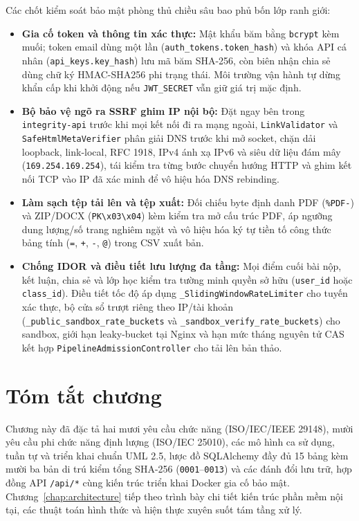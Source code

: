 Các chốt kiểm soát bảo mật phòng thủ chiều sâu bao phủ bốn lớp ranh giới:
{\setlength{\itemsep}{0pt}\setlength{\parskip}{0pt}
\begin{itemize}
    \item \textbf{Gia cố token và thông tin xác thực:} Mật khẩu băm bằng \texttt{bcrypt} kèm muối; token email dùng một lần (\texttt{auth\_tokens.token\_hash}) và khóa API cá nhân (\texttt{api\_keys.key\_hash}) lưu mã băm SHA-256, còn biên nhận chia sẻ dùng chữ ký HMAC-SHA256 phi trạng thái. Môi trường vận hành tự dừng khẩn cấp khi khởi động nếu \texttt{JWT\_SECRET} vẫn giữ giá trị mặc định.
    \item \textbf{Bộ bảo vệ ngõ ra SSRF ghim IP nội bộ:} Đặt ngay bên trong \texttt{integrity-api} trước khi mọi kết nối đi ra mạng ngoài, \texttt{LinkValidator} và \texttt{SafeHtml\allowbreak{}Meta\allowbreak{}Verifier} phân giải DNS trước khi mở socket, chặn dải loopback, link-local, RFC 1918, IPv4 ánh xạ IPv6 và siêu dữ liệu đám mây (\texttt{169.254.\allowbreak{}169.254}), tái kiểm tra từng bước chuyển hướng HTTP và ghim kết nối TCP vào IP đã xác minh để vô hiệu hóa DNS rebinding.
    \item \textbf{Làm sạch tệp tải lên và tệp xuất:} Đối chiếu byte định danh PDF (\texttt{\%PDF-}) và ZIP/DOCX (\texttt{PK\textbackslash x03\textbackslash x04}) kèm kiểm tra mở cấu trúc PDF, áp ngưỡng dung lượng/số trang nghiêm ngặt và vô hiệu hóa ký tự tiền tố công thức bảng tính (\texttt{=}, \texttt{+}, \texttt{-}, \texttt{@}) trong CSV xuất bản.
    \item \textbf{Chống IDOR và điều tiết lưu lượng đa tầng:} Mọi điểm cuối bài nộp, kết luận, chia sẻ và lớp học kiểm tra tường minh quyền sở hữu (\texttt{user\_id} hoặc \texttt{class\_id}). Điều tiết tốc độ áp dụng \texttt{\_Sliding\allowbreak{}Window\allowbreak{}RateLimiter} cho tuyến xác thực, bộ cửa sổ trượt riêng theo IP/tài khoản (\texttt{\_public\_sandbox\_rate\_buckets} và \mbox{\texttt{\_sandbox}}\texttt{\_verify\_rate\_buckets}) cho sandbox, giới hạn leaky-bucket tại Nginx và hạn mức tháng nguyên tử CAS kết hợp \texttt{PipelineAdmissionController} cho tải lên bản thảo.
\end{itemize}}

\section{Tóm tắt chương}

Chương này đã đặc tả hai mươi yêu cầu chức năng (ISO/IEC/IEEE 29148), mười yêu cầu phi chức năng định lượng (ISO/IEC 25010), các mô hình ca sử dụng, tuần tự và triển khai chuẩn UML 2.5, lược đồ SQLAlchemy đầy đủ 15 bảng kèm mười ba bản di trú kiểm tổng SHA-256 (\texttt{0001}--\texttt{0013}) và các đánh đổi lưu trữ, hợp đồng API \texttt{/api/*} cùng kiến trúc triển khai Docker gia cố bảo mật. Chương~\ref{chap:architecture} tiếp theo trình bày chi tiết kiến trúc phần mềm nội tại, các thuật toán hình thức và hiện thực xuyên suốt tám tầng xử lý.
